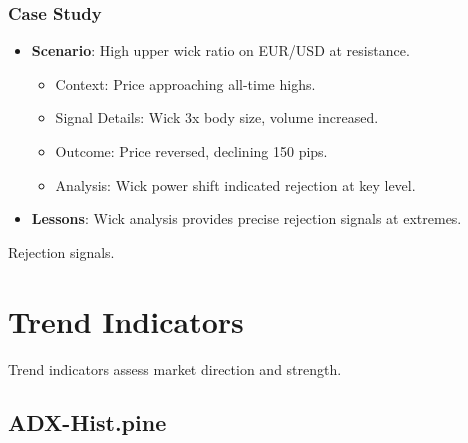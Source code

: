 \documentclass[12pt]{article}
\begin{document}
\subsubsection{Case Study}
\begin{itemize}
\item \textbf{Scenario}: High upper wick ratio on EUR/USD at resistance.
  \begin{itemize}
  \item Context: Price approaching all-time highs.
  \item Signal Details: Wick 3x body size, volume increased.
  \item Outcome: Price reversed, declining 150 pips.
  \item Analysis: Wick power shift indicated rejection at key level.
  \end{itemize}
\item \textbf{Lessons}: Wick analysis provides precise rejection signals at extremes.
\end{itemize}
Rejection signals.

\section{Trend Indicators}
\label{sec:trend}

Trend indicators assess market direction and strength.

\subsection{ADX-Hist.pine}
\label{subsec:adx}
\end{document}
